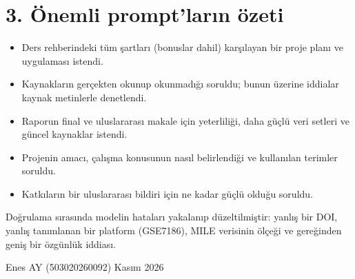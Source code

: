 \documentclass[11pt,a4paper]{article}
\begin{document}
\section*{3. Önemli prompt'ların özeti}
\begin{itemize}
\item Ders rehberindeki tüm şartları (bonuslar dahil) karşılayan bir proje planı ve uygulaması istendi.
\item Kaynakların gerçekten okunup okunmadığı soruldu; bunun üzerine iddialar kaynak metinlerle denetlendi.
\item Raporun final ve uluslararası makale için yeterliliği, daha güçlü veri setleri ve güncel kaynaklar istendi.
\item Projenin amacı, çalışma konusunun nasıl belirlendiği ve kullanılan terimler soruldu.
\item Katkıların bir uluslararası bildiri için ne kadar güçlü olduğu soruldu.
\end{itemize}

Doğrulama sırasında modelin hataları yakalanıp düzeltilmiştir: yanlış bir DOI, yanlış tanımlanan bir
platform (GSE7186), MILE verisinin ölçeği ve gereğinden geniş bir özgünlük iddiası.

\vspace{1em}
\noindent Enes AY (503020260092) \hfill Kasım 2026
\end{document}
